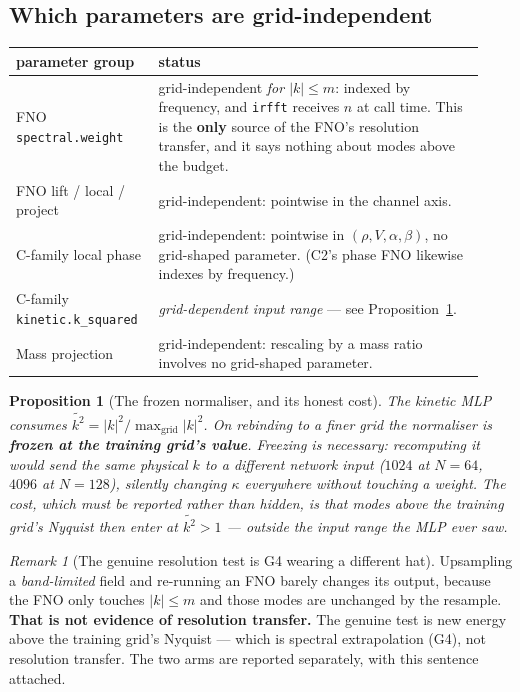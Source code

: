 \documentclass[11pt,a4paper]{article}
\theoremstyle{plain}
\newtheorem{proposition}[theorem]{Proposition}
\theoremstyle{definition}
\theoremstyle{remark}
\newtheorem{remark}[theorem]{Remark}
\newcommand{\code}[1]{\texttt{\small #1}}
\begin{document}
\subsection{Which parameters are grid-independent}

\begin{center}
\begin{tabular}{@{}p{0.27\linewidth}p{0.66\linewidth}@{}}
\toprule
\textbf{parameter group} & \textbf{status}\\
\midrule
FNO \code{spectral.weight} & grid-independent \emph{for $|k|\le m$}: indexed by frequency,
and \code{irfft} receives $n$ at call time. This is the \textbf{only} source of the FNO's
resolution transfer, and it says nothing about modes above the budget.\\
FNO lift / local / project & grid-independent: pointwise in the channel axis.\\
C-family local phase & grid-independent: pointwise in $(\rho,V,\alpha,\beta)$, no
grid-shaped parameter. (C2's phase FNO likewise indexes by frequency.)\\
C-family \code{kinetic.k\_squared} & \emph{grid-dependent input range} --- see
Proposition~\ref{prop:frozennorm}.\\
Mass projection & grid-independent: rescaling by a mass ratio involves no grid-shaped
parameter.\\
\bottomrule
\end{tabular}
\end{center}

\begin{proposition}[The frozen normaliser, and its honest cost]
\label{prop:frozennorm}
The kinetic MLP consumes $\widetilde{k^2} = |k|^2/\max_{\mathrm{grid}}|k|^2$. On rebinding
to a finer grid the normaliser is \textbf{frozen at the training grid's value}. Freezing is
necessary: recomputing it would send the same \emph{physical} $k$ to a different network
input ($1024$ at $N=64$, $4096$ at $N=128$), silently changing $\kappa$ everywhere without
touching a weight. The cost, which must be reported rather than hidden, is that modes above
the training grid's Nyquist then enter at $\widetilde{k^2}>1$ --- outside the input range
the MLP ever saw.
\end{proposition}

\begin{remark}[The genuine resolution test is G4 wearing a different hat]
Upsampling a \emph{band-limited} field and re-running an FNO barely changes its output,
because the FNO only touches $|k|\le m$ and those modes are unchanged by the resample.
\textbf{That is not evidence of resolution transfer.} The genuine test is new energy above
the training grid's Nyquist --- which is spectral extrapolation (G4), not resolution
transfer. The two arms are reported separately, with this sentence attached.
\end{remark}
\end{document}

